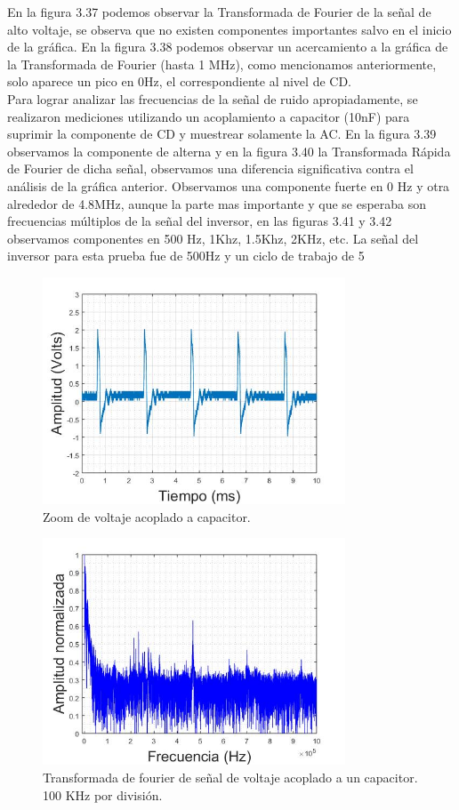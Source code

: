 En la figura 3.37 podemos observar la Transformada de Fourier de la señal de alto voltaje, se observa que no existen componentes importantes salvo en el inicio de la gráfica. En la figura 3.38 podemos observar un acercamiento a la gráfica de la Transformada de Fourier (hasta 1 MHz), como mencionamos anteriormente, solo aparece un pico en 0Hz, el correspondiente al nivel de CD.\\


Para lograr analizar las frecuencias de la señal de ruido apropiadamente, se realizaron mediciones utilizando un acoplamiento a capacitor (10nF) para suprimir la componente de CD y muestrear solamente la AC. En la figura 3.39 observamos la componente de alterna y en la figura 3.40 la Transformada Rápida de Fourier de dicha señal, observamos una diferencia significativa contra el análisis de la gráfica anterior. Observamos una componente fuerte en 0 Hz y otra alrededor de 4.8MHz, aunque la parte mas importante y que se esperaba son frecuencias múltiplos de la señal del inversor, en las figuras 3.41 y 3.42 observamos componentes en 500 Hz, 1Khz, 1.5Khz, 2KHz, etc. La señal del inversor para esta prueba fue de 500Hz y un ciclo de trabajo de 5%


\begin{figure}[H]
\centering
\includegraphics[width=9cm]{Capitulo3/figs/reso.jpg}
\caption{Zoom de voltaje acoplado a capacitor.}
\end{figure}

\begin{figure}[H]
\centering
\includegraphics[width=9cm]{Capitulo3/figs/X105.jpg}
\caption{Transformada de fourier de señal de voltaje acoplado a un capacitor. 100 KHz por división.}
\end{figure}

